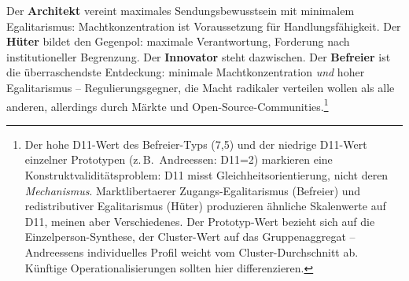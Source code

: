 \documentclass[12pt,a4paper]{article}
\begin{document}
\begin{table}[htbp]
  \centering
  \caption{Die vier Weltbild-Typen der KI-Elite. Die Werte sind Cluster-Durchschnitte aus den Gruppen-Synthesen; individuelle Abweichungen innerhalb eines Clusters können erheblich sein (vgl.\ die Andreessen-Diskrepanz in der nachfolgenden Fußnote).}
  \label{tab:typen}
  \small
\end{table}

Der \textbf{Architekt} vereint maximales Sendungsbewusstsein mit minimalem Egalitarismus: Machtkonzentration ist Voraussetzung für Handlungsfähigkeit. Der \textbf{Hüter} bildet den Gegenpol: maximale Verantwortung, Forderung nach institutioneller Begrenzung. Der \textbf{Innovator} steht dazwischen. Der \textbf{Befreier} ist die überraschendste Entdeckung: minimale Machtkonzentration \emph{und} hoher Egalitarismus -- Regulierungsgegner, die Macht radikaler verteilen wollen als alle anderen, allerdings durch Märkte und Open-Source-Communities.\footnote{Der hohe D11-Wert des Befreier-Typs (7,5) und der niedrige D11-Wert einzelner Prototypen (z.\,B.\ Andreessen: D11=2) markieren eine Konstruktvaliditätsproblem: D11 misst Gleichheitsorientierung, nicht deren \emph{Mechanismus}. Marktlibertaerer Zugangs-Egalitarismus (Befreier) und redistributiver Egalitarismus (Hüter) produzieren ähnliche Skalenwerte auf D11, meinen aber Verschiedenes. Der Prototyp-Wert bezieht sich auf die Einzelperson-Synthese, der Cluster-Wert auf das Gruppenaggregat -- Andreessens individuelles Profil weicht vom Cluster-Durchschnitt ab. Künftige Operationalisierungen sollten hier differenzieren.}
\end{document}
